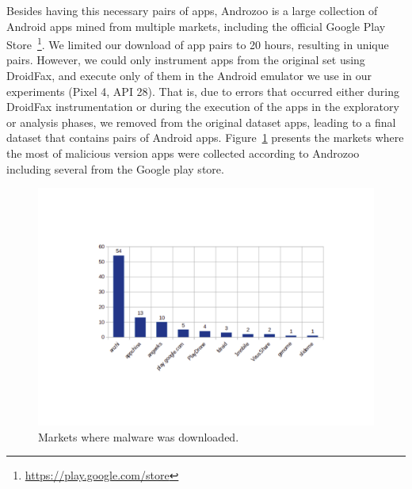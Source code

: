 Besides having this necessary pairs of apps, Androzoo is a large collection of Android apps mined from multiple markets, including the official Google Play Store~\footnote{\url{https://play.google.com/store}}. We limited our download of app pairs to 20 hours, resulting in  unique pairs. However, we could only instrument  apps from the original set using DroidFax, and execute only  of them in the Android emulator we use in our experiments (Pixel 4, API 28). That is, due to errors that occurred either during DroidFax instrumentation or during the execution of the apps in the exploratory or analysis phases, we removed from the original dataset  apps, leading to a final dataset that contains  pairs of Android apps. Figure~\ref{fig:stores} presents the markets where the most of malicious version apps were collected according to Androzoo including several from the Google play store.


\begin{figure}[ht]
\centering
\includegraphics[scale=0.3]{images/stores.pdf}
\caption{Markets where malware was downloaded.}
 \label{fig:stores}
\end{figure}


